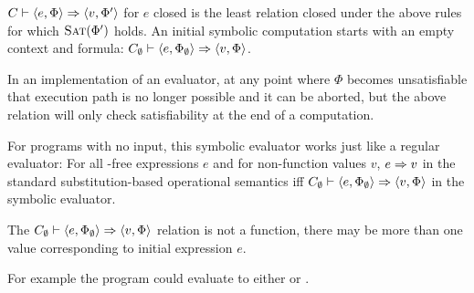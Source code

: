 \begin{definition}
$C \vdash \langle e, \Phi \rangle \Rightarrow \langle v, \Phi' \rangle$ for $e$ closed is the least relation closed under the above rules for which $\textsc{Sat}(\Phi')$ holds.  An initial symbolic computation starts with an empty context and formula: $C_\emptyset \vdash \langle e, \Phi_\emptyset \rangle \Rightarrow \langle v,\Phi\rangle$.
\end{definition}
 In an implementation of an evaluator, at any point where $\Phi$ becomes unsatisfiable that execution path is no longer possible and it can be aborted, but the above relation will only check satisfiability at the end of a computation.

\begin{lemma}[Soundness] 
For programs with no input, this symbolic evaluator works just like a regular evaluator:
 For all -free expressions $e$ and for non-function values $v$,  $ e \Rightarrow v$ in the standard substitution-based \Fb{} operational semantics iff $C_\emptyset \vdash \langle  e , \Phi_\emptyset \rangle \Rightarrow \langle v,\Phi\rangle$ in the symbolic evaluator.
\end{lemma}

\begin{lemma}[Nondeterminism] 
The $C_\emptyset \vdash \langle e , \Phi_\emptyset \rangle \Rightarrow \langle v,\Phi\rangle$ relation is not a function, there may be more than one value corresponding to initial expression $e$.
\end{lemma}

For example the program  could evaluate to either  or .


